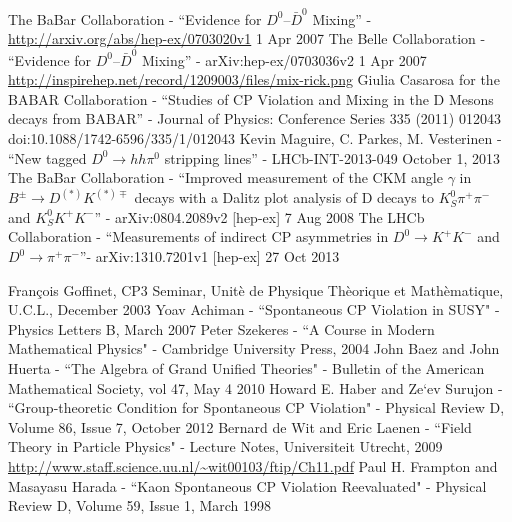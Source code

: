 \documentclass[floatfix,aps,prd,amsmath,amssymb]{revtex4}
\begin{document}
\begin{thebibliography}{10}
The BaBar Collaboration - ``Evidence for $D^{0}–\bar{D}^{0}$ Mixing'' - \url{http://arxiv.org/abs/hep-ex/0703020v1} 1 Apr 2007 
The Belle Collaboration - ``Evidence for $D^{0}–\bar{D}^{0}$ Mixing'' - arXiv:hep-ex/0703036v2 1 Apr 2007 
\url{http://inspirehep.net/record/1209003/files/mix-rick.png}
Giulia Casarosa for the BABAR Collaboration - ``Studies of CP Violation and Mixing in the D Mesons decays from BABAR'' - Journal of Physics: Conference Series 335 (2011) 012043   doi:10.1088/1742-6596/335/1/012043
Kevin Maguire, C. Parkes, M. Vesterinen - ``New tagged $D^{0} \rightarrow h h \pi^{0}$ stripping lines'' - LHCb-INT-2013-049 October 1, 2013
The BaBar Collaboration - ``Improved measurement of the CKM angle $\gamma$ in $B^{\pm} \rightarrow D^{(*)}K^{(*)\mp}$ decays with a Dalitz plot analysis of D decays to $K^{0}_S \pi^{+} \pi^{-}$ and $K^{0}_{S} K^{+} K^{−}$'' - arXiv:0804.2089v2 [hep-ex] 7 Aug 2008
The LHCb Collaboration - ``Measurements of indirect CP asymmetries in $D^{0} \rightarrow K^{+}K^{-}$ and $D^{0} \rightarrow \pi^{+} \pi^{-}$''- arXiv:1310.7201v1 [hep-ex] 27 Oct 2013


Fran\c{c}ois Goffinet, CP3 Seminar, Unit\`{e} de Physique Th\`{e}orique et Math\`{e}matique, U.C.L., December 2003
Yoav Achiman -  ``Spontaneous CP Violation in SUSY" - Physics Letters B, March 2007
Peter Szekeres - ``A Course in Modern Mathematical Physics" - Cambridge University Press, 2004
John Baez and John Huerta - ``The Algebra of Grand Unified Theories" - Bulletin of the American Mathematical Society, vol 47, May 4 2010
Howard E. Haber and Ze`ev Surujon - ``Group-theoretic Condition for Spontaneous CP Violation" - Physical Review D, Volume 86, Issue 7, October 2012
Bernard de Wit and Eric Laenen - ``Field Theory in Particle Physics" - Lecture Notes, Universiteit Utrecht, 2009 \url{http://www.staff.science.uu.nl/~wit00103/ftip/Ch11.pdf}
Paul H. Frampton and Masayasu Harada - ``Kaon Spontaneous CP Violation Reevaluated" - Physical Review D, Volume 59, Issue 1, March 1998


\end{thebibliography}
\end{document}
